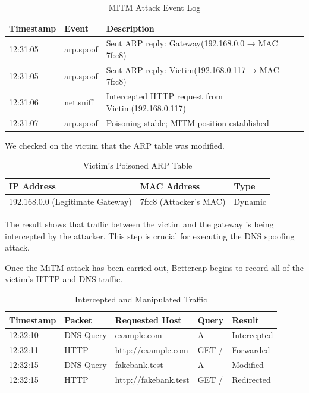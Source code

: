\documentclass[conference]{IEEEtran}
\begin{document}
\begin{table}[htbp]
\caption{MITM Attack Event Log}
\label{tab:events}
\begin{center}
\begin{tabular}{@{}p{1.5cm} p{1cm} p{5cm}@{}} \hline
\textbf{Timestamp} & \textbf{Event} & \textbf{Description} \\ \hline
12:31:05 & arp.spoof & Sent ARP reply: Gateway(192.168.0.0 → MAC 7f:c8) \\
12:31:05 & arp.spoof & Sent ARP reply: Victim(192.168.0.117 → MAC 7f:c8) \\
12:31:06 & net.sniff & Intercepted HTTP request from Victim(192.168.0.117) \\
12:31:07 & arp.spoof & Poisoning stable; MITM position established \\
\hline
\end{tabular}
\end{center}
\end{table}


We checked on the victim that the ARP table was modified.

\begin{table}[htbp]
\caption{Victim's Poisoned ARP Table}
\label{tab:poisonedarp}
\begin{center}
\begin{tabular}{@{}p{1.5cm} p{2.5cm} p{1.5cm}@{}} \hline
\textbf{IP Address} & \textbf{MAC Address} & \textbf{Type} \\ \hline
192.168.0.0 (Legitimate Gateway) & 7f:c8 (Attacker's MAC) & Dynamic \\
\hline
\end{tabular}
\end{center}
\end{table}


The result shows that traffic between the victim and the gateway is being intercepted by the attacker. This step is crucial for executing the DNS spoofing attack.

Once the MiTM attack has been carried out, Bettercap begins to record all of the victim's HTTP and DNS traffic.


\begin{table}[htbp]
\caption{Intercepted and Manipulated Traffic}
\label{tab:traffic}
\begin{center}
\begin{tabular}{@{}p{1.2cm} p{1.1cm} p{2.4cm} p{1cm} p{1.4cm}@{}} \hline
\textbf{Timestamp} & \textbf{Packet} & \textbf{Requested Host} & \textbf{Query} & \textbf{Result} \\ \hline
12:32:10 & DNS Query & example.com & A & Intercepted \\
12:32:11 & HTTP & http://example.com & GET / & Forwarded \\
12:32:15 & DNS Query & fakebank.test & A & Modified \\
12:32:15 & HTTP & http://fakebank.test & GET / & Redirected \\
\hline
\end{tabular}
\end{center}
\end{table}
\end{document}
